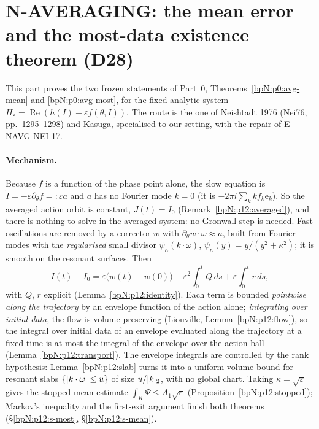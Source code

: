 \section{N-AVERAGING: the mean error and the most-data existence theorem (D28)}\label{bpN:p12}
\providecommand{\ek}[1]{\mathrm e_{#1}}
\providecommand{\Sph}{\mathbb S}
\providecommand{\Vol}{\operatorname{vol}}
\begingroup\sloppy

This part proves the two frozen statements of Part~0, Theorems~\ref{bpN:p0:avg-mean} and \ref{bpN:p0:avg-most}, for the fixed analytic system
$H_\varepsilon=\operatorname{Re}(h(I)+\varepsilon f(\theta,I))$. The route is the one of Neishtadt 1976 (Nei76, pp.~1295--1298) and Kasuga, specialised to our setting, with the repair of E-NAVG-NEI-17.

\paragraph{Mechanism.} Because $f$ is a function of the phase point alone, the slow equation is $\dot I=-\varepsilon\partial_\theta f=:\varepsilon a$ and $a$ has no Fourier mode $k=0$ (it is $-2\pi i\sum_kkf_k\ek k$). So the averaged action orbit is constant, $J(t)=I_0$ (Remark~\ref{bpN:p12:averaged}), and there is nothing to solve in the averaged system: no Gronwall step is needed. Fast oscillations are removed by a corrector $w$ with $\partial_\theta w\cdot\omega\approx a$, built from Fourier modes with the \emph{regularised} small divisor $\psi_\kappa(k\cdot\omega)$, $\psi_\kappa(y)=y/(y^2+\kappa^2)$; it is smooth on the resonant surfaces. Then
\[I(t)-I_0=\varepsilon\bigl(w(t)-w(0)\bigr)-\varepsilon^2\!\int_0^t\!Q\,ds+\varepsilon\!\int_0^t\!r\,ds,\]
with $Q$, $r$ explicit (Lemma~\ref{bpN:p12:identity}). Each term is bounded \emph{pointwise along the trajectory} by an envelope function of the action alone; \emph{integrating over initial data}, the flow is volume preserving (Liouville, Lemma~\ref{bpN:p12:flow}), so the integral over initial data of an envelope evaluated along the trajectory at a fixed time is at most the integral of the envelope over the action ball (Lemma~\ref{bpN:p12:transport}). The envelope integrals are controlled by the rank hypothesis: Lemma~\ref{bpN:p12:slab} turns it into a uniform volume bound for resonant slabs $\{\lvert k\cdot\omega\rvert\le u\}$ of size $u/\lvert k\rvert_2$, with no global chart. Taking $\kappa=\sqrt\varepsilon$ gives the stopped mean estimate $\int_K\Psi\le A_1\sqrt\varepsilon$ (Proposition~\ref{bpN:p12:stopped}); Markov's inequality and the first-exit argument finish both theorems (\S\ref{bpN:p12:s-most}, \S\ref{bpN:p12:s-mean}).

